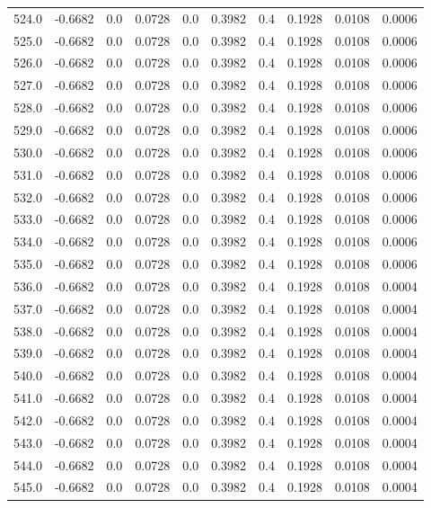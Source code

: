\begin{longtable}{lrrrrrrrrr}
524.0 & -0.6682 & 0.0 & 0.0728 & 0.0 & 0.3982 & 0.4 & 0.1928 & 0.0108 & 0.0006 \\
525.0 & -0.6682 & 0.0 & 0.0728 & 0.0 & 0.3982 & 0.4 & 0.1928 & 0.0108 & 0.0006 \\
526.0 & -0.6682 & 0.0 & 0.0728 & 0.0 & 0.3982 & 0.4 & 0.1928 & 0.0108 & 0.0006 \\
527.0 & -0.6682 & 0.0 & 0.0728 & 0.0 & 0.3982 & 0.4 & 0.1928 & 0.0108 & 0.0006 \\
528.0 & -0.6682 & 0.0 & 0.0728 & 0.0 & 0.3982 & 0.4 & 0.1928 & 0.0108 & 0.0006 \\
529.0 & -0.6682 & 0.0 & 0.0728 & 0.0 & 0.3982 & 0.4 & 0.1928 & 0.0108 & 0.0006 \\
530.0 & -0.6682 & 0.0 & 0.0728 & 0.0 & 0.3982 & 0.4 & 0.1928 & 0.0108 & 0.0006 \\
531.0 & -0.6682 & 0.0 & 0.0728 & 0.0 & 0.3982 & 0.4 & 0.1928 & 0.0108 & 0.0006 \\
532.0 & -0.6682 & 0.0 & 0.0728 & 0.0 & 0.3982 & 0.4 & 0.1928 & 0.0108 & 0.0006 \\
533.0 & -0.6682 & 0.0 & 0.0728 & 0.0 & 0.3982 & 0.4 & 0.1928 & 0.0108 & 0.0006 \\
534.0 & -0.6682 & 0.0 & 0.0728 & 0.0 & 0.3982 & 0.4 & 0.1928 & 0.0108 & 0.0006 \\
535.0 & -0.6682 & 0.0 & 0.0728 & 0.0 & 0.3982 & 0.4 & 0.1928 & 0.0108 & 0.0006 \\
536.0 & -0.6682 & 0.0 & 0.0728 & 0.0 & 0.3982 & 0.4 & 0.1928 & 0.0108 & 0.0004 \\
537.0 & -0.6682 & 0.0 & 0.0728 & 0.0 & 0.3982 & 0.4 & 0.1928 & 0.0108 & 0.0004 \\
538.0 & -0.6682 & 0.0 & 0.0728 & 0.0 & 0.3982 & 0.4 & 0.1928 & 0.0108 & 0.0004 \\
539.0 & -0.6682 & 0.0 & 0.0728 & 0.0 & 0.3982 & 0.4 & 0.1928 & 0.0108 & 0.0004 \\
540.0 & -0.6682 & 0.0 & 0.0728 & 0.0 & 0.3982 & 0.4 & 0.1928 & 0.0108 & 0.0004 \\
541.0 & -0.6682 & 0.0 & 0.0728 & 0.0 & 0.3982 & 0.4 & 0.1928 & 0.0108 & 0.0004 \\
542.0 & -0.6682 & 0.0 & 0.0728 & 0.0 & 0.3982 & 0.4 & 0.1928 & 0.0108 & 0.0004 \\
543.0 & -0.6682 & 0.0 & 0.0728 & 0.0 & 0.3982 & 0.4 & 0.1928 & 0.0108 & 0.0004 \\
544.0 & -0.6682 & 0.0 & 0.0728 & 0.0 & 0.3982 & 0.4 & 0.1928 & 0.0108 & 0.0004 \\
545.0 & -0.6682 & 0.0 & 0.0728 & 0.0 & 0.3982 & 0.4 & 0.1928 & 0.0108 & 0.0004 \\

\end{longtable}
